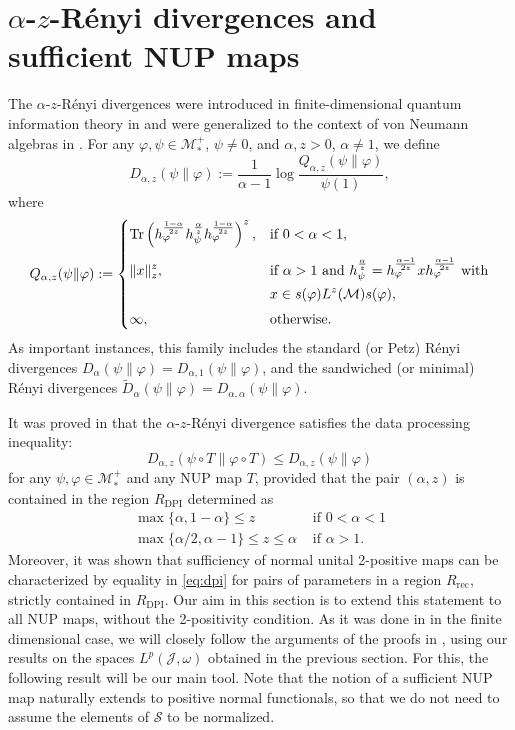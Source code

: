 \documentclass[12pt]{article}
\def\Me{\mathcal M}
\def\Je{\mathcal J}
\def\Se{\mathcal S}
\def\Tr{\mathrm{Tr}}
\theoremstyle{definition}
\theoremstyle{remark}
\begin{document}
\section{$\alpha$-$z$-R\'enyi divergences and sufficient NUP maps}

The $\alpha$-$z$-R\'enyi divergences were introduced in finite-dimensional quantum information theory in \cite{audenaert_-z-renyi_2015} and were generalized to the context of von Neumann algebras
in \cite{kato2024onrenyi}. For any $\varphi,\psi\in \Me^+_*$, $\psi\ne 0$, and 
$\alpha,z>0$, $\alpha\ne 1$, we define  
\[
D_{\alpha,z}(\psi\|\varphi):=\frac1{\alpha-1}\log
\frac{Q_{\alpha,z}(\psi\|\varphi)}{\psi(1)},
\]
where
\[
Q_{\alpha,z}(\psi\|\varphi):=\begin{dcases} \Tr
\left(h_\varphi^{\frac{1-\alpha}{2z}}h_\psi^{\frac{\alpha}{z}}h_\varphi^{\frac{1-\alpha}{2z}}\right)^z, &
\text{if } 0<\alpha<1,\\[0.3em]
\|x\|_z^z, & \text{if } \alpha>1 \text{ and }
h_\psi^{\frac{\alpha}{z}}=h_\varphi^{\frac{\alpha-1}{2z}}xh_\varphi^{\frac{\alpha-1}{2z}}
\ \text{with}\\ & x\in s(\varphi)L^z(\Me)s(\varphi),\\[0.3em]
\infty,& \text{otherwise}.
\end{dcases}
\]
As important instances, this family includes the standard (or Petz) R\'enyi divergences 
$D_\alpha(\psi\|\varphi)=D_{\alpha,1}(\psi\|\varphi)$, and the sandwiched (or minimal)
R\'enyi divergences $\tilde D_{\alpha}(\psi\|\varphi)=D_{\alpha,\alpha}(\psi\|\varphi)$.

It was proved in \cite{hiai2024alphaz} that the $\alpha$-$z$-R\'enyi divergence satisfies the
data processing inequality: 
\begin{equation}\label{eq:dpi}
D_{\alpha,z}(\psi\circ T\|\varphi\circ T)\le D_{\alpha,z}(\psi\|\varphi)
\end{equation}
for any $\psi,\varphi\in \Me_*^+$ and any NUP map $T$, provided that the pair 
$(\alpha,z)$ is  contained in the region $R_{\text{DPI}}$ determined as
\begin{align}\label{eq:dpi_region<1}
 \max\{\alpha,1-\alpha\}\le z &\text{ if }  0<\alpha<1\\
\max\{\alpha/2,\alpha-1\}\le z\le \alpha &\text{ if } \alpha>1. \label{eq:dpi_region>1}
\end{align}
Moreover, it was shown that sufficiency of normal unital 2-positive maps can be characterized by
equality in \eqref{eq:dpi} for pairs of parameters in a region $R_{\text{rec}}$, strictly
contained in $R_{\text{DPI}}$.
Our aim in this section is to extend this statement to all
NUP maps, without the 2-positivity condition. As it was done in
\cite{luijk2026sufficiency} in the finite dimensional case, we will closely follow the
arguments of the proofs in \cite{hiai2024alphaz}, using our results on the spaces 
$L^p(\Je,\omega)$ obtained in  the previous section.
For this,  the following result will be our main tool. Note that the notion of a
sufficient NUP map naturally extends to positive normal functionals, so
that 
we do not need to assume the elements of $\Se$ to be normalized. 
\end{document}
